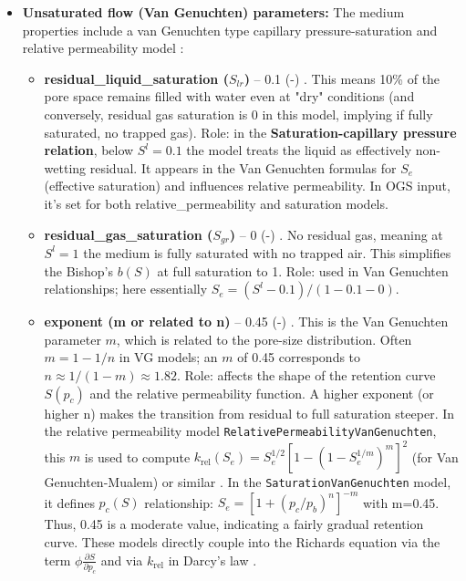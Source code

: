\documentclass[10pt,a4paper]{article}
\begin{document}
\begin{itemize}
    \item \textbf{Unsaturated flow (Van Genuchten) parameters:} The medium properties include a van Genuchten type capillary pressure-saturation and relative permeability model \cite{file:04_2_media_twophase}:
    \begin{itemize}
        \item \textbf{residual\_liquid\_saturation ($S_{lr}$)} – 0.1 (-) \cite{file:04_2_media_twophase}. This means 10\% of the pore space remains filled with water even at "dry" conditions (and conversely, residual gas saturation is 0 in this model, implying if fully saturated, no trapped gas). Role: in the \textbf{Saturation-capillary pressure relation}, below $S^l = 0.1$ the model treats the liquid as effectively non-wetting residual. It appears in the Van Genuchten formulas for $S_e$ (effective saturation) and influences relative permeability. In OGS input, it's set for both relative\_permeability and saturation models.
        \item \textbf{residual\_gas\_saturation ($S_{gr}$)} – 0 (-) \cite{file:04_2_media_twophase}. No residual gas, meaning at $S^l=1$ the medium is fully saturated with no trapped air. This simplifies the Bishop's $b(S)$ at full saturation to 1. Role: used in Van Genuchten relationships; here essentially $S_e = (S^l - 0.1) / (1-0.1-0)$.
        \item \textbf{exponent (m or related to n)} – 0.45 (-) \cite{file:04_2_media_twophase}. This is the Van Genuchten parameter $m$, which is related to the pore-size distribution. Often $m = 1 - 1/n$ in VG models; an $m$ of 0.45 corresponds to $n \approx 1/(1-m) \approx 1.82$. Role: affects the shape of the retention curve $S(p_c)$ and the relative permeability function. A higher exponent (or higher n) makes the transition from residual to full saturation steeper. In the relative permeability model \texttt{RelativePermeabilityVanGenuchten}, this $m$ is used to compute $k_{\text{rel}}(S_e) = S_e^{1/2}[1 - (1 - S_e^{1/m})^m]^2$ (for Van Genuchten-Mualem) or similar \cite{file:04_2_media_twophase}. In the \texttt{SaturationVanGenuchten} model, it defines $p_c(S)$ relationship: $S_e = [1+ (p_c/p_b)^{n}]^{-m}$ with m=0.45. Thus, 0.45 is a moderate value, indicating a fairly gradual retention curve. These models directly couple into the Richards equation via the term $\phi \frac{\partial S}{\partial p_c}$ \cite{ogs:trm} and via $k_{\text{rel}}$ in Darcy's law \cite{ogs:trm}.

\end{itemize}
\end{itemize}
\end{document}
